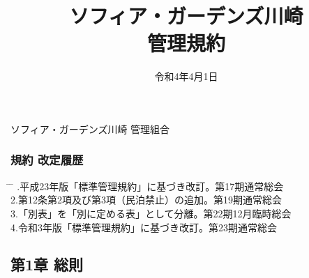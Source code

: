 \documentclass[
  luatex,
  paper=a4paper,
  fontsize=11pt,
  jafontsize=11pt,
  jlreq_notes,
]{jlreq}
\renewcommand{\baselinestretch}{0.9}
\begin{document}
  \pagestyle{empty} %
  \title{ソフィア・ガーデンズ川崎\\管理規約}
  \date{令和4年4月1日}
  \maketitle
  \thispagestyle{empty}
  \vfill      %

  \begin{center}
    \vspace*{3\baselineskip}
    {\Large ソフィア・ガーデンズ川崎 管理組合}
  \end{center}
  \vspace*{2\baselineskip}
  { \renewcommand{\baselinestretch}{0.8}\selectfont   %
    \subsubsection*{ 規約 改定履歴 }
    \vspace*{1\baselineskip}
    \begin{tabbing}
      \hspace{5mm} \= \hspace{90mm} \= \hspace{100mm} .\>平成23年版「標準管理規約」に基づき改訂。\>第17期通常総会\\
      2.\>第12条第2項及び第3項（民泊禁止）の追加。\>第19期通常総会\\
      3.\>「別表」を「別に定める表」として分離。\>第22期12月臨時総会\\
      4.\>令和3年版「標準管理規約」に基づき改訂。\>第23期通常総会\\
    \end{tabbing}
  }
  \clearpage

  { \renewcommand{\baselinestretch}{0.8}\selectfont
    \tableofcontents        %
  }
  \clearpage

  \setcounter{page}{1}    %
  \pagestyle{plain}       %

  \begin{center}
    \subsection*{第1章 総則}
  \end{center}
\end{document}
